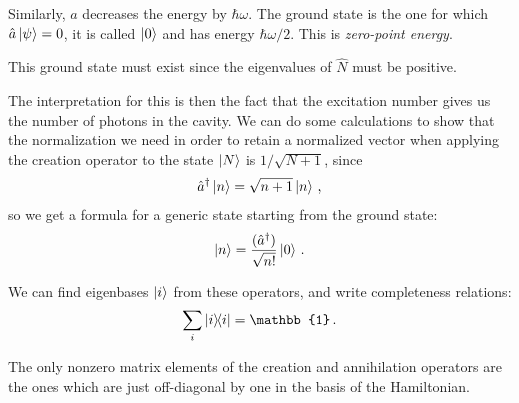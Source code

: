 \documentclass[main.tex]{subfiles}
\begin{document}
Similarly, \(\hat{a}\) decreases the energy by \(\hbar \omega \).  The ground state is the one for which \(\hat{a} \ket{\psi }= 0 \), it is called \(\ket{0} \) and has energy \(\hbar \omega /2\). This is \emph{zero-point energy}. 

This ground state must exist since the eigenvalues of \(\hat{N}\) must be positive.

The interpretation for this is then the fact that the excitation number gives us the number of photons in the cavity. We can do some calculations to show that the normalization we need in order to retain a normalized vector when applying the creation operator to the state \(\ket{N}\) is \(1 / \sqrt{N+1}\), since 
%
\begin{align}
\hat{a}^\dag \ket{n} = \sqrt{n+1} \ket{n}
\,,
\end{align}
%
so we get a formula for a generic state starting from the ground state:
%
\begin{align}
\ket{n}  = \frac{(\hat{a}^\dag)}{\sqrt{n!}} \ket{0} 
\,.
\end{align}

We can find eigenbases \(\ket{i}\) from these operators, and write completeness relations:
%
\begin{align}
\sum _{i} \ketbra{i}{i} = \mathbb{1}
\,.
\end{align}

The only nonzero matrix elements of the creation and annihilation operators are the ones which are just off-diagonal by one in the basis of the Hamiltonian. 
\end{document}
